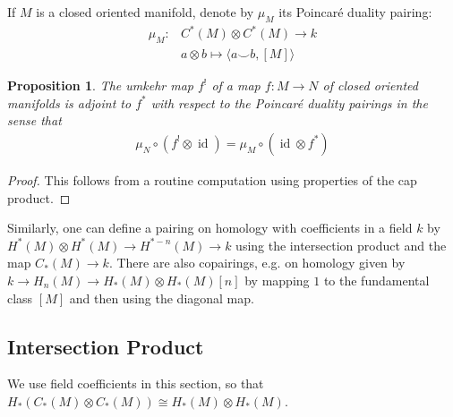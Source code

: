 \documentclass{scrartcl}
\theoremstyle{plain}
\newtheorem{proposition}[theorem]{Proposition}
\theoremstyle{definition}
\newcommand{\cupp}{\mathbin{\smile}}
\newcommand{\iso}{\cong}
\DeclareMathOperator{\id}{id}
\newcommand{\comp}{\mathbin{\circ}}
\begin{document}
If $M$ is a closed oriented manifold, denote by $\mu_M$ its Poincaré duality pairing:
\begin{align*}
    \mu_M\colon & C^*(M)\otimes C^*(M)\to k \\
    &a\otimes b \mapsto \langle a\cupp b, [M]\rangle
\end{align*}

\begin{proposition}
    The umkehr map $f^!$ of a map $f\colon M\to N$ of closed oriented manifolds is adjoint to $f^*$ with respect to the Poincaré duality pairings in the sense that
    \begin{align*}
        \mu_N\comp (f^!\otimes\id) = \mu_M\comp(\id\otimes f^*)
    \end{align*}
\end{proposition}
\begin{proof}
    This follows from a routine computation using properties of the cap product. 
\end{proof}
Similarly, one can define a pairing on homology with coefficients in a field $k$ by $H^*(M)\otimes H^*(M) \to H^{*-n}(M)\to k$ using the intersection product and the map $C_*(M)\to k$. There are also copairings, e.g. on homology given by $k\to H_n(M)\to H_*(M)\otimes H_*(M)[n]$ by mapping $1$ to the fundamental class $[M]$ and then using the diagonal map.

\subsection{Intersection Product} \label{subsec:intersection-product-via-pd}

We use field coefficients in this section, so that $H_*(C_*(M)\otimes C_*(M)) \iso H_*(M)\otimes H_*(M)$. %
\end{document}
